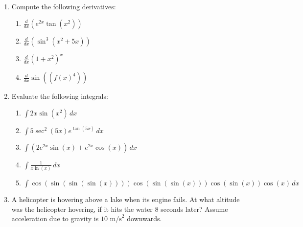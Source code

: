 \documentclass[12pt]{article}
\newcommand{\di}{\displaystyle}
\begin{document}
\begin{enumerate}
\item Compute the following derivatives:
\begin{enumerate}
\item $\di\frac{d}{dx}(e^{2x}\tan(x^2))$

\vspace{1cm}

\item $\di\frac{d}{dx}(\sin^3(x^2+5x))$

\vspace{1cm}

\item $\di\frac{d}{dx}(1+x^2)^x$

\vspace{1cm}

\item $\di \frac{d}{dx}\sin((f(x)^4))$

\vspace{0.75cm}

\end{enumerate}

\item Evaluate the following integrals:

\begin{enumerate}
\item $\di \int 2x\sin(x^2)\,dx$

\vspace{1cm}

\item $\di \int 5\sec^2(5x)e^{\tan(5x)}\,dx$

\vspace{1cm}

\item $\di \int (2e^{2x}\sin(x)+e^{2x}\cos(x))\,dx$

\vspace{1cm}

\item $\di \int \frac{1}{x\ln(x)}\,dx$

\vspace{1cm}

\item $\di \int \cos(\sin(\sin(\sin(x))))\cos(\sin(\sin(x)))\cos(\sin(x))\cos(x)\,dx$
\end{enumerate}
\newpage

\item A helicopter is hovering above a lake when its engine fails. At what altitude was the helicopter hovering, if it hits the water 8 seconds later? Assume acceleration due to gravity is $10 \text{ m/s}^2$ downwards.


\end{enumerate}
\end{document}
